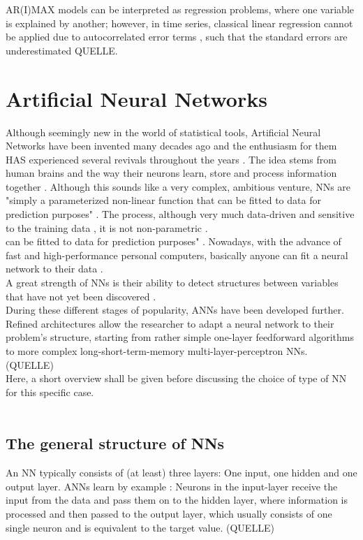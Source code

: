 \documentclass[a4paper, 11pt]{article}
\begin{document}
AR(I)MAX models can be interpreted as regression problems, where one variable is explained by another; however, in time series, classical linear regression cannot be applied due to autocorrelated error terms \citep{Cools.2009}, such that the standard errors are underestimated QUELLE.


\section{Artificial Neural Networks}


Although seemingly new in the world of statistical tools, Artificial Neural Networks have been invented many decades ago and the enthusiasm for them HAS experienced several revivals throughout the years \citep{Gao.2011}. The idea stems from human brains \citep{Zhang.1998} and the way their neurons learn, store and process information together \citep{Balkin.1997}. Although this sounds like a very complex, ambitious venture, NNs are "simply a parameterized non-linear function that can be fitted to data for prediction purposes" \citep{Nakamura.2005}. The process, although very much data-driven \citep{Zhang.1998} and sensitive to the training data \citep{Adhikari.2015}, it is not non-parametric \citep{Dorffner96neuralnetworks}. \\
can be fitted to data for prediction purposes" 	\citep{Nakamura.2005}. Nowadays, with the advance of fast and high-performance personal computers, basically anyone can fit a neural network to their data \citep{Gao.2011}.\\
A great strength of NNs is their ability to detect structures between variables that have not yet been discovered \citep{Zhang.1998}.\\ 
During these different stages of popularity, ANNs have been developed further. Refined architectures allow the researcher to adapt a neural network to their problem's structure, starting from rather simple one-layer feedforward algorithms to more complex long-short-term-memory multi-layer-perceptron NNs. (QUELLE)\\
Here, a short overview shall be given before discussing the choice of type of NN for this specific case.\\
\\
\subsection{The general structure of NNs}

An NN typically consists of (at least) three layers: One input, one hidden and one output layer. ANNs learn by example \citep{Balkin.1997, Gao.2011}: Neurons in the input-layer receive the input from the data and pass them on to the hidden layer, where information is processed and then passed to the output layer, which usually consists of one single neuron and is equivalent to the target value. (QUELLE)\\
\end{document}
